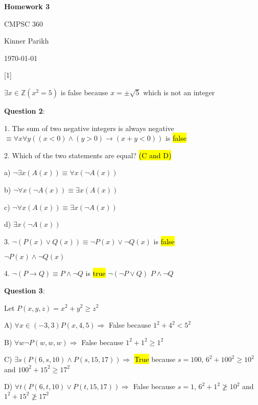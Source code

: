\documentclass{article} %
\newcommand{\question}[2][]{\begin{flushleft}
        \textbf{Question #1}: \textit{#2}

\end{flushleft}}
\newcommand{\maketitletwo}[2][]{\begin{center}
        \Large{\textbf{Homework #1}
            
            CMPSC 360} %
        \vspace{5pt}
        
        \normalsize{Kinner Parikh  %
        
        \today}        %
        \vspace{15pt}
        
\end{center}}
\begin{document}
    \maketitletwo[3]  %
    
    \question[1]{}

    $\exists x \in \mathbb{Z}(x ^ 2 = 5)$ is false because $x = \pm \sqrt{5}$ which is not an integer

    \question[2]{}

    1. The sum of two negative integers is always negative $\equiv \forall x \forall y((x < 0) \land (y > 0) \rightarrow (x + y < 0 ))$ \tabto{0.98cm} is \hl{false}

    \hspace{0cm}

    2. Which of the two statements are equal? \hl{(C and D)}

    \tabto{0.98cm}a) $\neg \exists x(A(x)) \equiv \forall x(\neg A(x))$

    \tabto{0.98cm}b) $\neg \forall x(\neg A(x)) \equiv \exists x(A(x))$

    \tabto{0.98cm}c) $\neg \forall x(A(x)) \equiv \exists x(\neg A(x))$

    \tabto{0.98cm}d) $\exists x(\neg A(x))$

    \hspace{0cm}

    3. $\neg (P(x) \lor Q(x)) \equiv \neg P(x) \lor \neg Q(x)$ is \hl{false}

    \tabto{0.98cm} $\neg P(x) \land \neg Q(x)$

    \hspace{0cm}

    4. $\neg (P \rightarrow Q) \equiv P \land \neg Q$ is \hl{true}
    \tabto{0.98cm} $\neg (\neg P \lor Q)$
    \tabto{0.98cm} $P \land \neg Q$

    \question[3]{}

    Let $P(x, y, z) = x^2 + y^2 \ge z^2$

    A) $\forall x \in (-3, 3) P(x, 4, 5) \Rightarrow$ False because $1^2 + 4^2 < 5^2$

    B) $\forall w \neg P(w, w, w) \Rightarrow$ False because $1^2 + 1^2 \geq 1^2$

    C) $\exists s (P(6, s, 10) \land P(s, 15, 17)) \Rightarrow$ \hl{True} because $s = 100$, $6^2 + 100^2 \ge 10^2$ and $100^2 + 15^2 \ge 17^2$

    D) $\forall t (P(6, t, 10) \lor P(t, 15, 17)) \Rightarrow$ False because $s = 1$, $6^2 + 1^2 \ngeq 10^2$ and $1^2 + 15^2 \ngeq 17^2$
\end{document}
